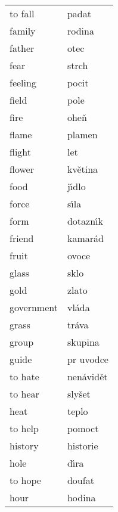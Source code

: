 \documentclass[11pt]{article}
\begin{document}
\begin{longtable}{ll}
 to fall                  &  padat               \\
 family                   &  rodina              \\
 father                   &  otec                \\
 fear                     &  strch               \\
 feeling                  &  pocit               \\
 field                    &  pole                \\
 fire                     &  ohe\v n             \\
 flame                    &  plamen              \\
 flight                   &  let                 \\
 flower                   &  kv\v etina          \\
 food                     &  j\'\i dlo           \\
 force                    &  s\'\i la            \\
 form                     &  dotazn\'\i k        \\
 friend                   &  kamar\'ad           \\
 fruit                    &  ovoce               \\
 glass                    &  sklo                \\
 gold                     &  zlato               \\
 government               &  vl\'ada             \\
 grass                    &  tr\'ava             \\
 group                    &  skupina             \\
 guide                    &  pr\accent23 uvodce  \\
 to hate                  &  nen\'avid\v et      \\
 to hear                  &  sly\v set           \\
 heat                     &  teplo               \\
 to help                  &  pomoct              \\
 history                  &  historie            \\
 hole                     &  d\'\i ra            \\
 to hope                  &  doufat              \\
 hour                     &  hodina              \\

\end{longtable}
\end{document}
